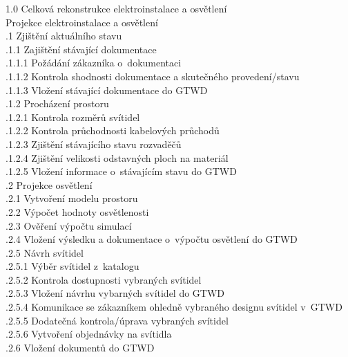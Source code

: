 \documentclass[a4paper, twoside, 11pt]{article}
\begin{document}
				1.0 Celková rekonstrukce elektroinstalace a osvětlení\\
				 Projekce elektroinstalace a osvětlení\\
				\indent {}.1 Zjištění aktuálního stavu\\
				\indent \indent {}.1.1 Zajištění stávající dokumentace\\
				\indent \indent \indent {}.1.1.1 Požádání zákazníka o~dokumentaci\\
				\indent \indent \indent {}.1.1.2 Kontrola shodnosti dokumentace a skutečného provedení/stavu\\
				\indent \indent \indent {}.1.1.3 Vložení stávající dokumentace do GTWD\\
				\indent \indent {}.1.2 Procházení prostoru\\
				\indent \indent \indent {}.1.2.1 Kontrola rozměrů svítidel\\
				\indent \indent \indent {}.1.2.2 Kontrola průchodnosti kabelových průchodů\\
				\indent \indent \indent {}.1.2.3 Zjištění stávajícího stavu rozvaděčů\\
				\indent \indent \indent {}.1.2.4 Zjištění velikosti odstavných ploch na materiál\\
				\indent \indent \indent {}.1.2.5 Vložení informace o~stávajícím stavu do GTWD\\

			\indent {}.2 Projekce osvětlení\\
			\indent \indent {}.2.1 Vytvoření modelu prostoru\\
			\indent \indent {}.2.2 Výpočet hodnoty osvětlenosti\\
			\indent \indent {}.2.3 Ověření výpočtu simulací\\
			\indent \indent {}.2.4 Vložení výsledku a dokumentace o~výpočtu osvětlení do GTWD\\
			\indent \indent {}.2.5 Návrh svítidel\\
				\indent \indent \indent {}.2.5.1 Výběr svítidel z~katalogu\\
				\indent \indent \indent {}.2.5.2 Kontrola dostupnosti vybraných svítidel\\
				\indent \indent \indent {}.2.5.3 Vložení návrhu vybarných svítidel do GTWD\\
				\indent \indent \indent {}.2.5.4 Komunikace se zákazníkem ohledně vybraného designu svítidel v~GTWD\\
				\indent \indent \indent {}.2.5.5 Dodatečná kontrola/úprava vybraných svítidel\\
				\indent \indent \indent {}.2.5.6 Vytvoření objednávky na svítidla\\
			\indent \indent \indent {}.2.6 Vložení dokumentů do GTWD\\
			
\end{document}
